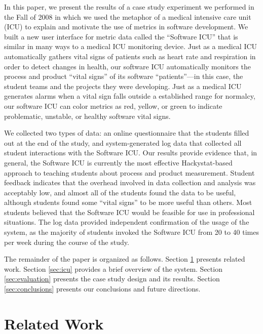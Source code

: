 \documentclass{acm_proc_article-sp}
\begin{document}
In this paper, we present the results of a case study experiment we
performed in the Fall of 2008 in which we used the metaphor of a medical
intensive care unit (ICU) to explain and motivate the use of metrics in
software development.  We built a new user interface for metric data called
the ``Software ICU'' that is similar in many ways to a medical ICU
monitoring device.  Just as a medical ICU automatically gathers vital signs
of patients such as heart rate and respiration in order to detect changes
in health, our software ICU automatically monitors the process and product
``vital signs'' of its software ``patients''---in this case, the student
teams and the projects they were developing.  Just as a medical ICU
generates alarms when a vital sign falls outside a established range for
normalcy, our software ICU can color metrics as red, yellow, or green to
indicate problematic, unstable, or healthy software vital signs. 

We collected two types of data: an online questionnaire that the students
filled out at the end of the study, and system-generated log data that
collected all student interactions with the Software ICU.  Our results
provide evidence that, in general, the Software ICU is currently the most
effective Hackystat-based approach to teaching students about process and
product measurement.  Student feedback indicates that the overhead involved
in data collection and analysis was acceptably low, and almost all of the
students found the data to be useful, although students found some ``vital
signs'' to be more useful than others. Most students believed that the
Software ICU would be feasible for use in professional situations.  The log
data provided independent confirmation of the usage of the system, as the
majority of students invoked the Software ICU from 20 to 40 times per week
during the course of the study.

The remainder of the paper is organized as follows.  Section
\ref{sec:related} presents related work.  Section \ref{sec:icu} provides a
brief overview of the system. Section \ref{sec:evaluation} presents the
case study design and its results.  Section \ref{sec:conclusions} presents
our conclusions and future directions.

\section {Related Work}
\label{sec:related}
\end{document}

